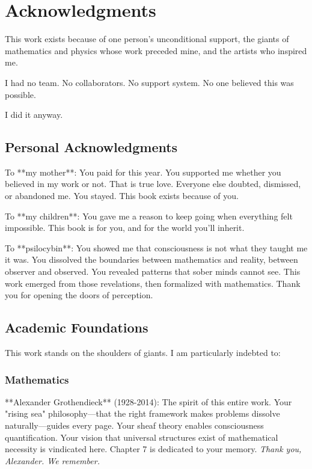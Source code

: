 \chapter*{Acknowledgments}

\begingroup
\sloppy

This work exists because of one person's unconditional support, the giants of mathematics and physics whose work preceded mine, and the artists who inspired me.

I had no team. No collaborators. No support system. No one believed this was possible.

I did it anyway.

\section*{Personal Acknowledgments}

To **my mother**: You paid for this year. You supported me whether you believed in my work or not. That is true love. Everyone else doubted, dismissed, or abandoned me. You stayed. This book exists because of you.

To **my children**: You gave me a reason to keep going when everything felt impossible. This book is for you, and for the world you'll inherit.

To **psilocybin**: You showed me that consciousness is not what they taught me it was. You dissolved the boundaries between mathematics and reality, between observer and observed. You revealed patterns that sober minds cannot see. This work emerged from those revelations, then formalized with mathematics. Thank you for opening the doors of perception.

\section*{Academic Foundations}

This work stands on the shoulders of giants. I am particularly indebted to:

\subsection*{Mathematics}

**Alexander Grothendieck** (1928-2014): The spirit of this entire work. Your "rising sea" philosophy—that the right framework makes problems dissolve naturally—guides every page. Your sheaf theory enables consciousness quantification. Your vision that universal structures exist of mathematical necessity is vindicated here. Chapter 7 is dedicated to your memory. \textit{Thank you, Alexander. We remember.}

